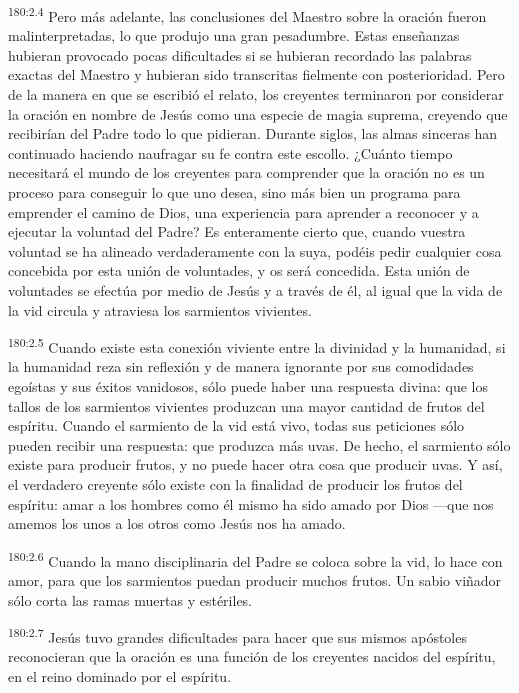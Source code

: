 \par 
\textsuperscript{180:2.4} Pero más adelante, las conclusiones del Maestro sobre la oración fueron malinterpretadas, lo que produjo una gran pesadumbre. Estas enseñanzas hubieran provocado pocas dificultades si se hubieran recordado las palabras exactas del Maestro y hubieran sido transcritas fielmente con posterioridad. Pero de la manera en que se escribió el relato, los creyentes terminaron por considerar la oración en nombre de Jesús como una especie de magia suprema, creyendo que recibirían del Padre todo lo que pidieran. Durante siglos, las almas sinceras han continuado haciendo naufragar su fe contra este escollo. ¿Cuánto tiempo necesitará el mundo de los creyentes para comprender que la oración no es un proceso para conseguir lo que uno desea, sino más bien un programa para emprender el camino de Dios, una experiencia para aprender a reconocer y a ejecutar la voluntad del Padre? Es enteramente cierto que, cuando vuestra voluntad se ha alineado verdaderamente con la suya, podéis pedir cualquier cosa concebida por esta unión de voluntades, y os será concedida. Esta unión de voluntades se efectúa por medio de Jesús y a través de él, al igual que la vida de la vid circula y atraviesa los sarmientos vivientes.

\par 
\textsuperscript{180:2.5} Cuando existe esta conexión viviente entre la divinidad y la humanidad, si la humanidad reza sin reflexión y de manera ignorante por sus comodidades egoístas y sus éxitos vanidosos, sólo puede haber una respuesta divina: que los tallos de los sarmientos vivientes produzcan una mayor cantidad de frutos del espíritu. Cuando el sarmiento de la vid está vivo, todas sus peticiones sólo pueden recibir una respuesta: que produzca más uvas. De hecho, el sarmiento sólo existe para producir frutos, y no puede hacer otra cosa que producir uvas. Y así, el verdadero creyente sólo existe con la finalidad de producir los frutos del espíritu: amar a los hombres como él mismo ha sido amado por Dios ---que nos amemos los unos a los otros como Jesús nos ha amado.

\par 
\textsuperscript{180:2.6} Cuando la mano disciplinaria del Padre se coloca sobre la vid, lo hace con amor, para que los sarmientos puedan producir muchos frutos. Un sabio viñador sólo corta las ramas muertas y estériles.

\par 
\textsuperscript{180:2.7} Jesús tuvo grandes dificultades para hacer que sus mismos apóstoles reconocieran que la oración es una función de los creyentes nacidos del espíritu, en el reino dominado por el espíritu.

